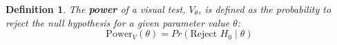 \documentclass[12pt]{article}
\newcommand{\red}[1]{{\color{red} #1}}
\newcommand{\green}[1]{{\color{green} #1}} %
\newtheorem{dfn}{Definition}[section]
\begin{document}










%
%
\begin{dfn} \label{dfn:power}
The \textbf{power} of a visual test, $V_{\theta}$, is defined as the probability to reject the null hypothesis for a given parameter value $\theta$:
    \begin{equation*}
      \text{Power}_V(\theta)= Pr(\text{Reject } H_0 \mid \theta) 
    \end{equation*}
\end{dfn}
\end{document}
